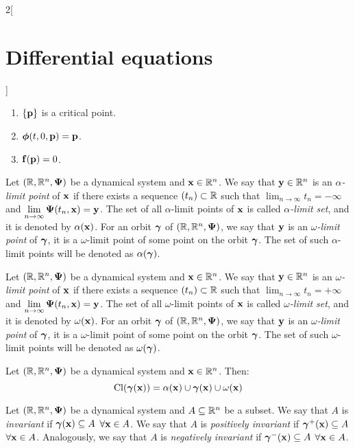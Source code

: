 \documentclass[../../../main_math.tex]{subfiles}
\begin{document}
\begin{multicols}{2}[\section{Differential equations}]
\begin{proposition}
    \begin{enumerate}
      \item $\{\boldsymbol{\mathrm{p}}\}$ is a critical point.
      \item $\boldsymbol{\mathrm{\phi}}(t,0,\boldsymbol{\mathrm{p}})=\boldsymbol{\mathrm{p}}$.
      \item $\boldsymbol{\mathrm{f}}(\boldsymbol{\mathrm{p}})=0$.
    \end{enumerate}
  \end{proposition}
  \begin{definition}
    Let $(\mathbb{R},\mathbb{R}^n,\boldsymbol{\mathrm{\Psi}})$ be a dynamical system and $\boldsymbol{\mathrm{x}}\in\mathbb{R}^n$. We say that $\boldsymbol{\mathrm{y}}\in\mathbb{R}^n$ is an \emph{$\alpha$-limit point} of $\boldsymbol{\mathrm{x}}$ if there exists a sequence $(t_n)\subset\mathbb{R}$ such that $\displaystyle\lim_{n\to\infty}t_n=-\infty$ and $\displaystyle\lim_{n\to\infty}\boldsymbol{\mathrm{\Psi}}(t_n,\boldsymbol{\mathrm{x}})=\boldsymbol{\mathrm{y}}$.
    The set of all $\alpha$-limit points of $\boldsymbol{\mathrm{x}}$ is called \emph{$\alpha$-limit set}, and it is denoted by $\alpha(\boldsymbol{\mathrm{x}})$. For an orbit $\boldsymbol{\mathrm{\gamma}}$ of $(\mathbb{R},\mathbb{R}^n,\boldsymbol{\mathrm{\Psi}})$, we say that $\boldsymbol{\mathrm{y}}$ is an \emph{$\omega$-limit point} of $\boldsymbol{\mathrm{\gamma}}$, it is a $\omega$-limit point of some point on the orbit $\boldsymbol{\mathrm{\gamma}}$. The set of such $\alpha$-limit points will be denoted as $\alpha(\boldsymbol{\mathrm{\gamma}})$.
  \end{definition}
  \begin{definition}
    Let $(\mathbb{R},\mathbb{R}^n,\boldsymbol{\mathrm{\Psi}})$ be a dynamical system and $\boldsymbol{\mathrm{x}}\in\mathbb{R}^n$. We say that $\boldsymbol{\mathrm{y}}\in\mathbb{R}^n$ is an \emph{$\omega$-limit point} of $\boldsymbol{\mathrm{x}}$ if there exists a sequence $(t_n)\subset\mathbb{R}$ such that $\displaystyle\lim_{n\to\infty}t_n=+\infty$ and $\displaystyle\lim_{n\to\infty}\boldsymbol{\mathrm{\Psi}}(t_n,\boldsymbol{\mathrm{x}})=\boldsymbol{\mathrm{y}}$.
    The set of all $\omega$-limit points of $\boldsymbol{\mathrm{x}}$ is called \emph{$\omega$-limit set}, and it is denoted by $\omega(\boldsymbol{\mathrm{x}})$. For an orbit $\boldsymbol{\mathrm{\gamma}}$ of $(\mathbb{R},\mathbb{R}^n,\boldsymbol{\mathrm{\Psi}})$, we say that $\boldsymbol{\mathrm{y}}$ is an \emph{$\omega$-limit point} of $\boldsymbol{\mathrm{\gamma}}$, it is a $\omega$-limit point of some point on the orbit $\boldsymbol{\mathrm{\gamma}}$. The set of such $\omega$-limit points will be denoted as $\omega(\boldsymbol{\mathrm{\gamma}})$.
  \end{definition}
  \begin{proposition}
    Let $(\mathbb{R},\mathbb{R}^n,\boldsymbol{\mathrm{\Psi}})$ be a dynamical system and $\boldsymbol{\mathrm{x}}\in\mathbb{R}^n$. Then: $$\operatorname{Cl}(\boldsymbol{\mathrm{\gamma}}(\boldsymbol{\mathrm{x}}))=\alpha(\boldsymbol{\mathrm{x}})\cup\boldsymbol{\mathrm{\gamma}}(\boldsymbol{\mathrm{x}})\cup\omega(\boldsymbol{\mathrm{x}})$$
  \end{proposition}
  \begin{definition}
    Let $(\mathbb{R},\mathbb{R}^n,\boldsymbol{\mathrm{\Psi}})$ be a dynamical system and $A\subseteq \mathbb{R}^n$ be a subset. We say that $A$ is \emph{invariant} if $\boldsymbol{\mathrm{\gamma}}(\boldsymbol{\mathrm{x}})\subseteq A$ $\forall\boldsymbol{\mathrm{x}}\in A$. We say that $A$ is \emph{positively invariant} if ${\boldsymbol{\mathrm{\gamma}}}^+(\boldsymbol{\mathrm{x}})\subseteq A$ $\forall\boldsymbol{\mathrm{x}}\in A$. Analogously, we say that $A$ is \emph{negatively invariant} if ${\boldsymbol{\mathrm{\gamma}}}^-(\boldsymbol{\mathrm{x}})\subseteq A$ $\forall\boldsymbol{\mathrm{x}}\in A$.

\end{definition}
\end{multicols}
\end{document}
